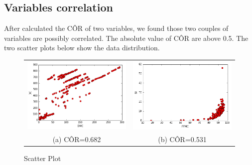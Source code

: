 \subsection{Variables correlation}
After calculated the C\^{O}R of two variables, we found those two couples of variables are possibly correlated. The absolute value of C\^{O}R are above 0.5. The two scatter plots below show the data distribution.
\begin{figure}[!ht]
\begin{tabular}{cc}
  \includegraphics[width=65mm]{fig/correlated/DMC_DC.png} &   \includegraphics[width=65mm]{fig/correlated/FFMC_ISI.png} \\
(a) C\^{O}R=0.682 & (b) C\^{O}R=0.531 \\[6pt]
\end{tabular}
\caption{ Scatter Plot }
\end{figure}